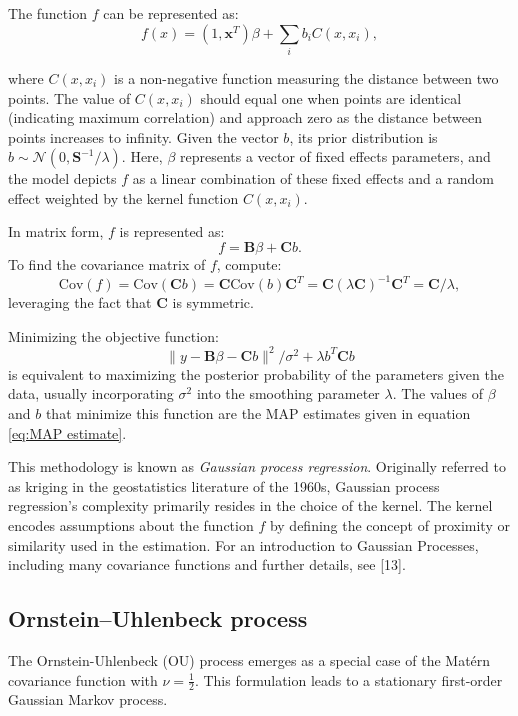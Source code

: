 \documentclass[
11pt, %
oneside, %
english, %
singlespacing, %
]{macthesis} %
\begin{document}
The function \(f\) can be represented as:
\[
f(x) = (1, \mathbf{x}^T)\beta + \sum_i b_i C(x, x_i),
\]

where \(C(x, x_i)\) is a non-negative function measuring the distance between two points. The value of \(C(x, x_i)\) should equal one when points are identical (indicating maximum correlation) and approach zero as the distance between points increases to infinity. Given the vector \(b\), its prior distribution is \(b \sim \mathcal{N}(0, \mathbf{S}^{-1}/\lambda)\). Here, \(\beta\) represents a vector of fixed effects parameters, and the model depicts \(f\) as a linear combination of these fixed effects and a random effect weighted by the kernel function \(C(x, x_i)\).

In matrix form, \(f\) is represented as:
\[
f = \mathbf{B} \beta + \mathbf{C}b.
\]
To find the covariance matrix of \(f\), compute:
\[
\text{Cov}(f) = \text{Cov}(\mathbf{C}b) = \mathbf{C} \text{Cov}(b) \mathbf{C}^T = \mathbf{C} (\lambda \mathbf{C})^{-1} \mathbf{C}^T = \mathbf{C} / \lambda,
\]
leveraging the fact that \(\mathbf{C}\) is symmetric.

Minimizing the objective function:
\[
\|y - \mathbf{B}\beta - \mathbf{C}b\|^2/\sigma^2 + \lambda b^T \mathbf{C} b
\]
is equivalent to maximizing the posterior probability of the parameters given the data, usually incorporating \(\sigma^2\) into the smoothing parameter \(\lambda\). The values of \(\beta\) and \(b\) that minimize this function are the MAP estimates given in equation \ref{eq:MAP estimate}.

This methodology is known as \emph{Gaussian process regression}. Originally referred to as kriging in the geostatistics literature of the 1960s, Gaussian process regression's complexity primarily resides in the choice of the kernel. The kernel encodes assumptions about the function \(f\) by defining the concept of proximity or similarity used in the estimation. For an introduction to Gaussian Processes, including many covariance functions and further details, see {[}13{]}.

\subsection{Ornstein--Uhlenbeck process}\label{OU}

The Ornstein-Uhlenbeck (OU) process emerges as a special case of the Matérn covariance function with \(\nu = \frac{1}{2}\). This formulation leads to a stationary first-order Gaussian Markov process.
\end{document}
